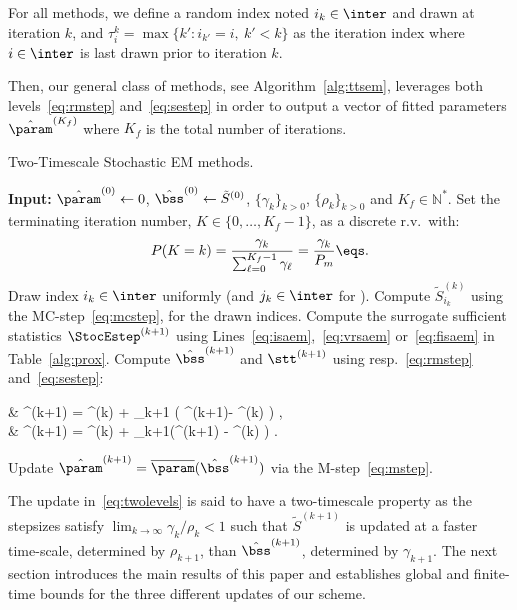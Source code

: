\documentclass[bj]{imsart}
\numberwithin{equation}{section}
\theoremstyle{plain}
\begin{document}
\medskip
{} For all methods, we define a random index noted $i_k \in \inter$ and drawn at iteration $k$, and $\tau_i^k = \max \{ k' : i_{k'} = i,~k' < k \}$ as the iteration index where $i \in \inter$ is last drawn prior to iteration $k$.



Then, our general class of methods, see Algorithm~\ref{alg:ttsem}, leverages both levels~\eqref{eq:rmstep} and~\eqref{eq:sestep} in order to output a vector of fitted parameters $\hat{\param}^{({ K}_{ f })}$ where ${ K}_{ f }$ is the total number of iterations.
\begin{algorithm}[t]
\caption{Two-Timescale Stochastic EM methods.}\label{alg:ttsem}
  \begin{algorithmic}[1]
  \STATE \textbf{Input:} $\hat{\param}^{(0)} \leftarrow 0$, $\hat{\bss}^{(0)} \leftarrow \tilde{S}^{(0)}$, $\{\gamma_k\}_{k>0}$, $\{\rho_k\}_{k>0}$ and $ { K}_{ f }\in \mathbb{N}^*$.
  \STATE Set the terminating iteration number, $K \in \{0,\dots,{ K}_{ f }-1\}$, as a discrete r.v.~with:
  \begin{equation} \label{eq:random}
   P( K = k ) = \frac{ \gamma_{k} }{\sum_{\ell=0}^{{ K}_{ f }-1} \gamma_\ell} = \frac{\gamma_k}{{ P}_{ m}}\eqs.
  \end{equation}
  \STATE Draw index $i_k \in \inter$ uniformly (and $j_k \in \inter$ for \FISAEM).
     \STATE Compute $\tilde{S}_{i_k}^{(k)}$ using the { MC-step}~\eqref{eq:mcstep},  for the drawn indices.
   \STATE Compute the surrogate sufficient statistics $\StocEstep^{(k+1)}$ using Lines~\ref{eq:isaem},~\ref{eq:vrsaem} or~\ref{eq:fisaem} in Table~\ref{alg:prox}.
   \STATE Compute $\hat{\bss}^{(k+1)}$ and $\stt^{(k+1)}$ using resp.~\eqref{eq:rmstep} and~\eqref{eq:sestep}:
\beq \label{eq:twolevels}
\begin{split}
& \stt^{(k+1)} = \stt^{(k)} + \rho_{k+1} ( \StocEstep^{(k+1)}- \stt^{(k)}  ) \eqs,\\
&  \hat{\bss}^{(k+1)} =  \hat{\bss}^{(k)}  + \gamma_{k+1}(\stt^{(k+1)} - \hat{\bss}^{(k)} ) \eqs.
\end{split}
\eeq
 \STATE Update $\hat{\param}^{(k+1)} = \overline{\param}(  \hat{\bss}^{(k+1)}) $ via the M-step~\eqref{eq:mstep}.
\ENDFOR
  \end{algorithmic}
\end{algorithm}
The update in~\eqref{eq:twolevels} is said to have a {two-timescale} property as the stepsizes satisfy $\lim_{k \to \infty} \gamma_k/\rho_k < 1$ such that $ \tilde{S}^{(k+1)} $  is updated at a faster time-scale, determined by $\rho_{k+1}$, than $\hat{\bss}^{(k+1)}$, determined by $\gamma_{k+1}$.
The next section introduces the main results of this paper and establishes global and finite-time bounds for the three different updates of our scheme. 
\end{document}

